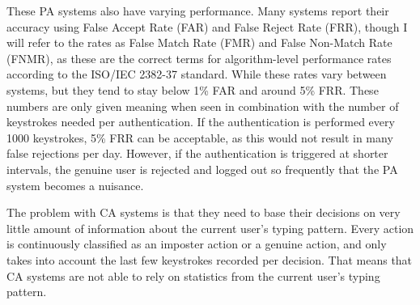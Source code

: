 \documentclass[informationsecurity]{gucmasterproject}
\begin{document}
These PA systems also have varying performance.
Many systems report their accuracy using False Accept Rate (FAR) and False Reject Rate (FRR), though I will refer to the rates as False Match Rate (FMR) and False Non-Match Rate (FNMR), as these are the correct terms for algorithm-level performance rates according to the ISO/IEC 2382-37 standard.
While these rates vary between systems, but they tend to stay below 1\% FAR and around 5\% FRR.
These numbers are only given meaning when seen in combination with the number of keystrokes needed per authentication.
If the authentication is performed every 1000 keystrokes, 5\% FRR can be acceptable, as this would not result in many false rejections per day.
However, if the authentication is triggered at shorter intervals, the genuine user is rejected and logged out so frequently that the PA system becomes a nuisance.

The problem with CA systems is that they need to base their decisions on very little amount of information about the current user's typing pattern.
Every action is continuously classified as an imposter action or a genuine action, and only takes into account the last few keystrokes recorded per decision.
That means that CA systems are not able to rely on statistics from the current user's typing pattern.


%
\end{document}

